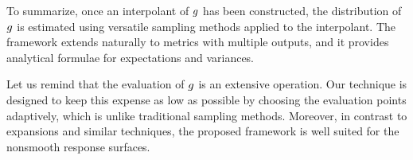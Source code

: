To summarize, once an interpolant of $g$ has been constructed, the distribution
of $g$ is estimated using versatile sampling methods applied to the
interpolant. The framework extends naturally to metrics with multiple outputs,
and it provides analytical formulae for expectations and variances.

Let us remind that the evaluation of $g$ is an extensive operation. Our
technique is designed to keep this expense as low as possible by choosing the
evaluation points adaptively, which is unlike traditional sampling methods.
Moreover, in contrast to  expansions and similar techniques, the proposed
framework is well suited for the nonsmooth response surfaces.
